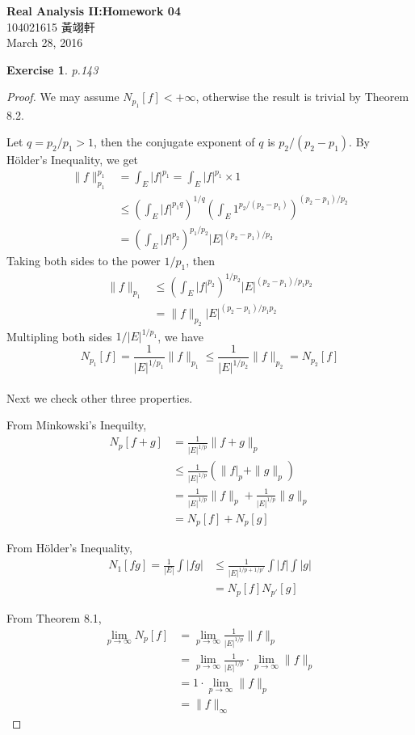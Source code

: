 \documentclass[11pt,a4paper]{article}
\renewcommand{\(}{\left(}
\renewcommand{\)}{\right)}
\renewcommand{\[}{\left[}
\renewcommand{\]}{\right]}
\renewcommand{\title}{Real Analysis II:\quad Homework 04}
\renewcommand{\author}{104021615 黃翊軒}
\renewcommand{\maketitle}{\begin{center}\textbf{\Large\title}\\[6pt] {\author}\\[6pt] {\color{Gray}\footnotesize March 28, 2016}\end{center}}
\newtheorem{exercise}{Exercise}
\begin{document}
  \maketitle


  \setcounter{exercise}{4}
  
  \begin{exercise}
  	p.143
  \end{exercise}
  \begin{proof}
  	We may assume $N_{p_1}[f]<+\infty$, otherwise the result is trivial by Theorem 8.2.
  	
  	Let $q = p_2/p_1 > 1$, then the conjugate exponent of $q$ is $p_2/(p_2-p_1)$. By H\"older's Inequality, we get
  	\begin{align*}
  	\|f\|_{p_1}^{p_1}&=\int_E|f|^{p_1} = \int_E|f|^{p_1}\times 1\\
  	&\le \(\int_E|f|^{p_1q}\)^{1/q}\(\int_E 1^{p_2/(p_2-p_1)}\)^{(p_2-p_1)/p_2}\\
  	&= \(\int_E|f|^{p_2}\)^{p_1/p_2}|E|^{(p_2-p_1)/p_2}
    \end{align*}
    Taking both sides to the power $1/p_1$, then
    \begin{align*}
    \|f\|_{p_1}&\le\(\int_E|f|^{p_2}\)^{1/p_2}|E|^{(p_2-p_1)/p_1p_2}\\
    &=\|f\|_{p_2}|E|^{(p_2-p_1)/p_1p_2}
    \end{align*}
    Multipling both sides $1/|E|^{1/p_1}$, we have
    $$
    N_{p_1}[f]=\frac{1}{|E|^{1/p_1}}\|f\|_{p_1}\le\frac{1}{|E|^{1/p_2}}\|f\|_{p_2}=N_{p_2}[f]
    $$
    \\
    
    Next we check other three properties.

    From  Minkowski's Inequilty,
    \begin{align*}
    	N_p[f+g] &= \frac{1}{|E|^{1/p}}\|f+g\|_p\\
    	&\le \frac{1}{|E|^{1/p}}\(\|f|_p+\|g\|_p\)\\
    	&= \frac{1}{|E|^{1/p}}\|f\|_p+\frac{1}{|E|^{1/p}}\|g\|_p\\
    	&= N_p[f]+N_p[g]
    \end{align*}
    
    From H\"older's Inequality,
    \begin{align*}
    N_1[fg] = \frac{1}{|E|}\int|fg| &\le \frac{1}{|E|^{1/p+1/p'}}\int|f|\int|g|\\
    &= N_p[f]N_{p'}[g]
    \end{align*}
    
    From Theorem 8.1,
    \begin{align*}
    \lim_{p\rightarrow\infty}N_p[f] &= \lim_{p\rightarrow\infty}\frac{1}{|E|^{1/p}}\|f\|_p\\
    &=\lim_{p\rightarrow\infty}\frac{1}{|E|^{1/p}}\cdot\lim_{p\rightarrow\infty}\|f\|_p\\
    &=1\cdot\lim_{p\rightarrow\infty}\|f\|_p\\
    &=\|f\|_\infty
    \end{align*}
  \end{proof}
  
\end{document}
